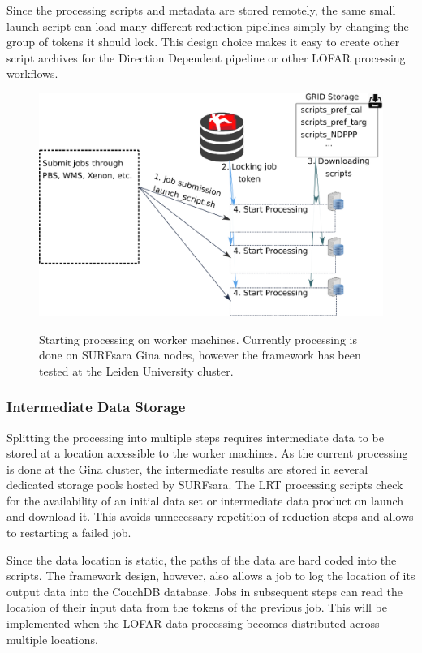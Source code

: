 Since the processing scripts and metadata are stored remotely, the same small launch script can load many different reduction pipelines simply by changing the group of tokens it should lock.  This design choice makes it easy to create other script archives for the Direction Dependent pipeline or other LOFAR processing workflows. 

\begin{figure}
 \includegraphics[width=.76\textwidth]{ch3/figures/token_run.eps}\\
    \caption[Starting processing on worker machines]{Starting processing on worker machines. Currently processing is done on SURFsara Gina nodes, however the framework has been tested at the Leiden University cluster.}
 \label{fig:ch3_tok_run}
\end{figure}


\subsubsection{Intermediate Data Storage}\label{sec:ch3_intermediate_storage}

Splitting the processing into multiple steps requires intermediate data to be stored at a location accessible to the worker machines. As the current processing is done at the Gina cluster, the intermediate results are stored in several dedicated
storage pools hosted by SURFsara. The LRT processing scripts check for the availability of an initial data set or intermediate data product on launch and download it. This avoids unnecessary repetition of reduction steps and allows to restarting a failed job.

Since the data location is static, the paths of the data are hard coded into the scripts. The framework design, however, also allows a job to log the location of its output data into the CouchDB database. Jobs in subsequent steps can read the location of their input data from the tokens of the previous job. This will be implemented when the LOFAR data processing becomes distributed across multiple locations. 

